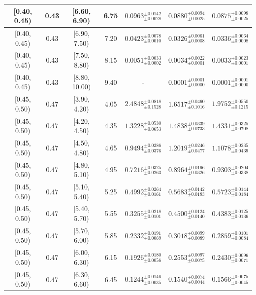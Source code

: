 \begin{longtable}{|c|c|c|c|c|c|c|}
[0.40, 0.45) & 0.43 & [6.60, 6.90) & 6.75 & $0.0963^{ \pm 0.0142 }_{ \pm 0.0028 }$ & $0.0880^{ \pm 0.0094 }_{ \pm 0.0025 }$ & $0.0875^{ \pm 0.0098 }_{ \pm 0.0025 }$ \\ 
\hline
[0.40, 0.45) & 0.43 & [6.90, 7.50) & 7.20 & $0.0423^{ \pm 0.0078 }_{ \pm 0.0010 }$ & $0.0326^{ \pm 0.0061 }_{ \pm 0.0008 }$ & $0.0336^{ \pm 0.0064 }_{ \pm 0.0008 }$ \\ 
\hline
[0.40, 0.45) & 0.43 & [7.50, 8.80) & 8.15 & $0.0051^{ \pm 0.0033 }_{ \pm 0.0002 }$ & $0.0034^{ \pm 0.0022 }_{ \pm 0.0001 }$ & $0.0033^{ \pm 0.0023 }_{ \pm 0.0001 }$ \\ 
\hline
[0.40, 0.45) & 0.43 & [8.80, 10.00) & 9.40 & - & $0.0001^{ \pm 0.0001 }_{ \pm 0.0000 }$ & $0.0001^{ \pm 0.0001 }_{ \pm 0.0000 }$ \\ 
\hline
[0.45, 0.50) & 0.47 & [3.90, 4.20) & 4.05 & $2.4848^{ \pm 0.0818 }_{ \pm 0.1528 }$ & $1.6517^{ \pm 0.0460 }_{ \pm 0.1016 }$ & $1.9752^{ \pm 0.0550 }_{ \pm 0.1215 }$ \\ 
\hline
[0.45, 0.50) & 0.47 & [4.20, 4.50) & 4.35 & $1.3228^{ \pm 0.0530 }_{ \pm 0.0653 }$ & $1.4838^{ \pm 0.0339 }_{ \pm 0.0733 }$ & $1.4331^{ \pm 0.0325 }_{ \pm 0.0708 }$ \\ 
\hline
[0.45, 0.50) & 0.47 & [4.50, 4.80) & 4.65 & $0.9494^{ \pm 0.0386 }_{ \pm 0.0376 }$ & $1.2019^{ \pm 0.0246 }_{ \pm 0.0477 }$ & $1.1078^{ \pm 0.0235 }_{ \pm 0.0439 }$ \\ 
\hline
[0.45, 0.50) & 0.47 & [4.80, 5.10) & 4.95 & $0.7216^{ \pm 0.0325 }_{ \pm 0.0263 }$ & $0.8964^{ \pm 0.0196 }_{ \pm 0.0326 }$ & $0.9303^{ \pm 0.0204 }_{ \pm 0.0338 }$ \\ 
\hline
[0.45, 0.50) & 0.47 & [5.10, 5.40) & 5.25 & $0.4992^{ \pm 0.0264 }_{ \pm 0.0161 }$ & $0.5683^{ \pm 0.0142 }_{ \pm 0.0183 }$ & $0.5723^{ \pm 0.0144 }_{ \pm 0.0184 }$ \\ 
\hline
[0.45, 0.50) & 0.47 & [5.40, 5.70) & 5.55 & $0.3255^{ \pm 0.0218 }_{ \pm 0.0101 }$ & $0.4500^{ \pm 0.0124 }_{ \pm 0.0140 }$ & $0.4383^{ \pm 0.0125 }_{ \pm 0.0136 }$ \\ 
\hline
[0.45, 0.50) & 0.47 & [5.70, 6.00) & 5.85 & $0.2332^{ \pm 0.0191 }_{ \pm 0.0069 }$ & $0.3018^{ \pm 0.0099 }_{ \pm 0.0089 }$ & $0.2859^{ \pm 0.0101 }_{ \pm 0.0084 }$ \\ 
\hline
[0.45, 0.50) & 0.47 & [6.00, 6.30) & 6.15 & $0.1926^{ \pm 0.0180 }_{ \pm 0.0056 }$ & $0.2553^{ \pm 0.0097 }_{ \pm 0.0075 }$ & $0.2430^{ \pm 0.0096 }_{ \pm 0.0071 }$ \\ 
\hline
[0.45, 0.50) & 0.47 & [6.30, 6.60) & 6.45 & $0.1244^{ \pm 0.0146 }_{ \pm 0.0035 }$ & $0.1540^{ \pm 0.0074 }_{ \pm 0.0044 }$ & $0.1566^{ \pm 0.0075 }_{ \pm 0.0045 }$ \\ 

\end{longtable}
